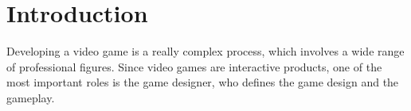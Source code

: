 \chapter{Introduction}

Developing a video game is a really complex process, which involves a wide range of professional figures. Since video games are interactive products, one of the most important roles is the game designer, who defines the game design and the gameplay. 